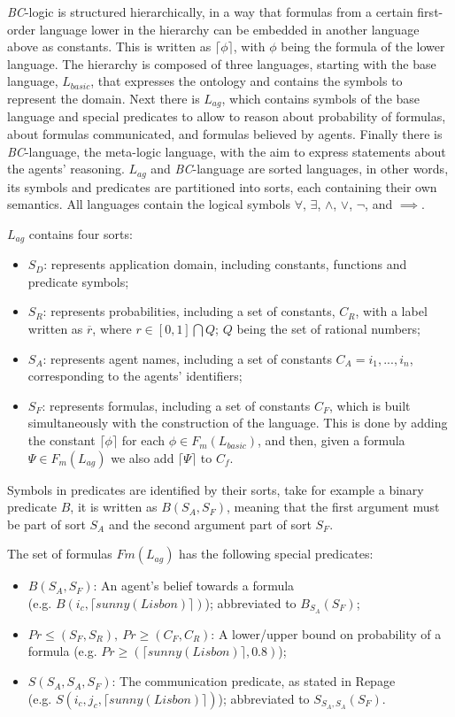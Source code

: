 \textit{BC}-logic is structured hierarchically, in a way that formulas from a certain first-order language lower in the hierarchy can be embedded in another language above as constants. This is written as $\lceil\phi\rceil$, with $\phi$ being the formula of the lower language.
The hierarchy is composed of three languages, starting with the base language, \textit{$L_{basic}$}, that expresses the ontology and contains the symbols to represent the domain. Next there is \textit{$L_{ag}$}, which contains symbols of the base language and special predicates to allow to reason about probability of formulas, about formulas communicated, and formulas believed by agents. Finally there is \textit{BC}-language, the meta-logic language, with the aim to express statements about the agents' reasoning. \textit{$L_{ag}$} and \textit{BC}-language are sorted languages, in other words, its symbols and predicates are partitioned into sorts, each containing their own semantics. All languages contain the logical symbols $\forall$, $\exists$, $\wedge$, $\vee$, $\neg$, and $\implies$.

\textit{$L_{ag}$} contains four sorts:
\begin{itemize}
    \item $S_D$: represents application domain, including constants, functions and predicate symbols;
    \item $S_R$: represents probabilities, including a set of constants, $C_R$, with a label written as $\overline{r}$, where $r \in [0,1]\bigcap Q$; $Q$ being the set of rational numbers;
    \item $S_A$: represents agent names, including a set of constants $C_A = {i_1, ..., i_n}$, corresponding to the agents' identifiers;
    \item $S_F$: represents formulas, including a set of constants $C_F$, which is built simultaneously with the construction of the language. This is done by adding the constant $\lceil\phi\rceil$ for each $\phi \in F_m(L_{basic})$, and then, given a formula $\Psi \in F_m(L_{ag})$ we also add $\lceil\Psi\rceil$ to $C_f$.
\end{itemize}

Symbols in predicates are identified by their sorts, take for example a binary predicate $B$, it is written as $B(S_A, S_F)$, meaning that the first argument must be part of sort $S_A$ and the second argument part of sort $S_F$.

The set of formulas $Fm(L_{ag})$ has the following special predicates:
\begin{itemize}
    \item $B(S_A, S_F)$: An agent's belief towards a formula \\(e.g. $B(i_c, \lceil sunny(Lisbon)\rceil)$); abbreviated to $B_{S_A}(S_F)$;
    \item $Pr\leq(S_F, S_R),\ Pr\geq(C_F, C_R)$: A lower/upper bound on probability of a formula (e.g. $Pr\geq(\lceil sunny(Lisbon)\rceil, 0.8)$);
    \item $S(S_A, S_A, S_F)$: The communication predicate, as stated in Repage \\(e.g. $S(i_c, j_c, \lceil sunny(Lisbon)\rceil)$);
    abbreviated to $S_{S_A, S_A}(S_F)$.
\end{itemize}


